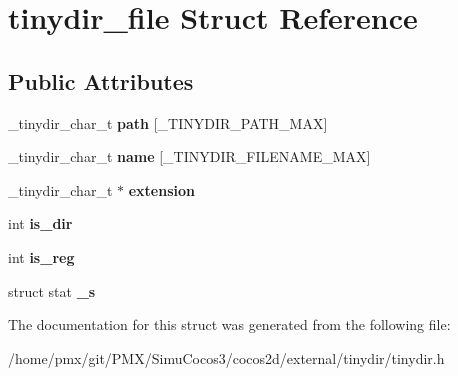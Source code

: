 \hypertarget{structtinydir__file}{}\section{tinydir\+\_\+file Struct Reference}
\label{structtinydir__file}
\subsection*{Public Attributes}
\begin{DoxyCompactItemize}
\item 
\mbox{\label{structtinydir__file_a6ca794f217eb2c2b74ce07a17f74b1f3}} 
\+\_\+tinydir\+\_\+char\+\_\+t {\bfseries path} \mbox{[}\+\_\+\+T\+I\+N\+Y\+D\+I\+R\+\_\+\+P\+A\+T\+H\+\_\+\+M\+AX\mbox{]}
\item 
\mbox{\label{structtinydir__file_adbd035af9b7cf25dfdf692ab0045c829}} 
\+\_\+tinydir\+\_\+char\+\_\+t {\bfseries name} \mbox{[}\+\_\+\+T\+I\+N\+Y\+D\+I\+R\+\_\+\+F\+I\+L\+E\+N\+A\+M\+E\+\_\+\+M\+AX\mbox{]}
\item 
\mbox{\label{structtinydir__file_a95f17c9c7d16ad040d02570a0cb3632e}} 
\+\_\+tinydir\+\_\+char\+\_\+t $\ast$ {\bfseries extension}
\item 
\mbox{\label{structtinydir__file_a702617c7ea4fad8a0ebde539eec9e5a7}} 
int {\bfseries is\+\_\+dir}
\item 
\mbox{\label{structtinydir__file_a5d54c59718ccf7ada9fba3aec8c109bf}} 
int {\bfseries is\+\_\+reg}
\item 
\mbox{\label{structtinydir__file_a71140206c03eb005035143ec3032a712}} 
struct stat {\bfseries \+\_\+s}
\end{DoxyCompactItemize}


The documentation for this struct was generated from the following file\+:\begin{DoxyCompactItemize}
\item 
/home/pmx/git/\+P\+M\+X/\+Simu\+Cocos3/cocos2d/external/tinydir/tinydir.\+h\end{DoxyCompactItemize}
